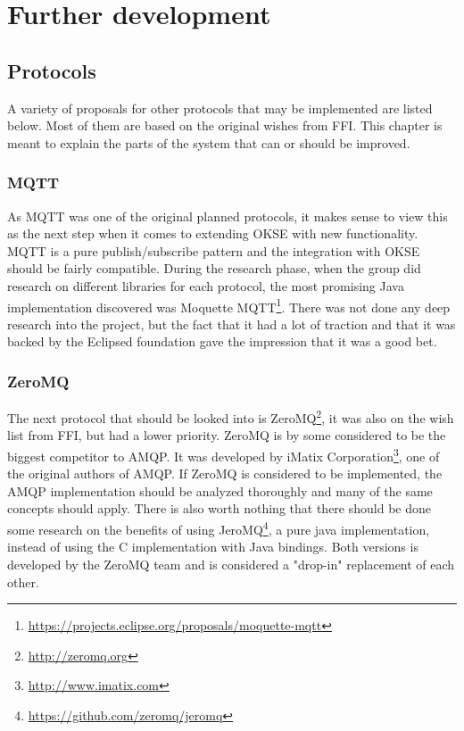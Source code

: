 
\chapter{Further development}

\section{Protocols}
A variety of proposals for other protocols that may be implemented are listed below. Most of them are based on the original wishes from FFI. This chapter is meant to explain the parts of the system that can or should be improved. 

\subsection{MQTT}
As MQTT was one of the original planned protocols, it makes sense to view this as the next step when it comes to extending OKSE with new functionality. MQTT is a pure publish/subscribe pattern and the integration with OKSE should be fairly compatible. 
During the research phase, when the group did research on different libraries for each protocol, the most promising Java implementation discovered was Moquette MQTT\footnote{\url{https://projects.eclipse.org/proposals/moquette-mqtt}}. There was not done any deep research into the project, but the fact that it had a lot of traction and that it was backed by the Eclipsed foundation gave the impression that it was a good bet.

\subsection{ZeroMQ}
The next protocol that should be looked into is ZeroMQ\footnote{\url{http://zeromq.org}}, it was also on the wish list from FFI, but had a lower priority. ZeroMQ is by some considered to be the biggest competitor to AMQP. It was developed by iMatix Corporation\footnote{\url{http://www.imatix.com}}, one of the original authors of AMQP. If ZeroMQ is considered to be implemented, the AMQP implementation should be analyzed thoroughly and many of the same concepts should apply. There is also worth nothing that there should be done some research on the benefits of using JeroMQ\footnote{\url{https://github.com/zeromq/jeromq}}, a pure java implementation, instead of using the C implementation with Java bindings. Both versions is developed by the ZeroMQ team and is considered a "drop-in" replacement of each other.
